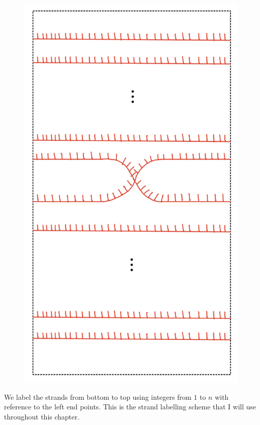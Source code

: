\begin{figure}[H] 
    \centering
    \includegraphics[scale = 0.95]{diagrams/natural_alternating_diagrams/8.png} 
    \caption{}
    \label{fig:your-label}
\end{figure}


We label the strands from bottom to top using integers from $1$ to $n$ with reference to the left end points. This is the strand labelling scheme that I will use throughout this chapter.


